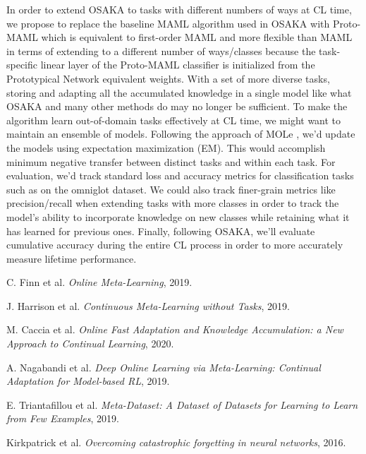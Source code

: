 \documentclass[12pt]{article}
\begin{document}
In order to extend OSAKA to tasks with different numbers of ways at CL time, we propose to replace the baseline MAML algorithm used in OSAKA with Proto-MAML \cite{protomaml} which is equivalent to first-order MAML and more flexible than MAML in terms of extending to a different number of ways/classes because the task-specific linear layer of the Proto-MAML classifier is initialized from the Prototypical Network equivalent weights. With a set of more diverse tasks, storing and adapting all the accumulated knowledge in a single model like what OSAKA and many other methods do may no longer be sufficient. To make the algorithm learn out-of-domain tasks effectively at CL time, we might want to maintain an ensemble of models. Following the approach of MOLe \cite{mole}, we'd update the models using expectation maximization (EM). This would accomplish minimum negative transfer between distinct tasks and within each task. For evaluation, we'd track standard loss and accuracy metrics for classification tasks such as on the omniglot dataset. We could also track finer-grain metrics like precision/recall when extending tasks with more classes in order to track the model's ability to incorporate knowledge on new classes while retaining what it has learned for previous ones. Finally, following OSAKA, we'll evaluate cumulative accuracy during the entire CL process in order to more accurately measure lifetime performance.
 
 
\begin{thebibliography}{9}
	C. Finn et al. \textit{Online Meta-Learning}, 2019.
	
	J. Harrison et al.
	\textit{Continuous Meta-Learning without Tasks}, 2019.
	
	M. Caccia et al. \textit{Online Fast Adaptation and Knowledge Accumulation: a New Approach to Continual Learning}, 2020.
	
	A. Nagabandi et al. \textit{Deep Online Learning via Meta-Learning: Continual Adaptation for Model-based RL}, 2019.
	
	E. Triantafillou et al. \textit{Meta-Dataset: A Dataset of Datasets for Learning to Learn from Few Examples}, 2019.
	
	Kirkpatrick et al. \textit{Overcoming catastrophic forgetting in neural networks}, 2016.
\end{thebibliography}
\end{document}

